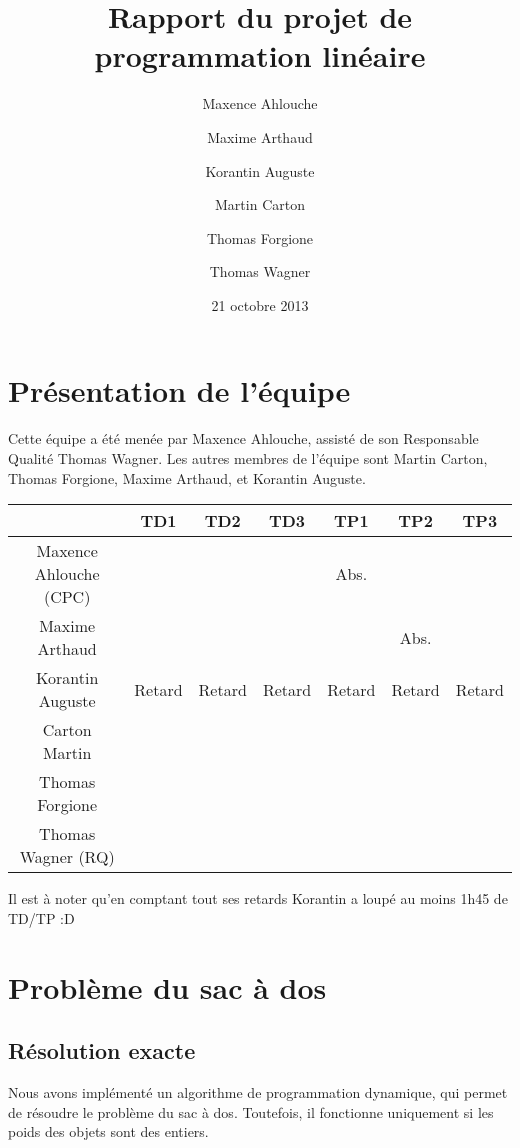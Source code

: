 \documentclass{scrartcl}
\begin{document}
\title{Rapport du projet de programmation linéaire}
\author{Maxence Ahlouche \and Maxime Arthaud \and Korantin Auguste
          \and Martin Carton \and Thomas Forgione \and Thomas Wagner}
\date{21 octobre 2013}
\maketitle
\tableofcontents
\newpage

\section{Présentation de l'équipe}
  Cette équipe a été menée par Maxence Ahlouche, assisté de son Responsable
  Qualité Thomas Wagner. Les autres membres de l'équipe sont Martin Carton,
  Thomas Forgione, Maxime Arthaud, et Korantin Auguste.

  \begin{table}[h]
    \centering
    \begin{tabular}{|c||c|c|c||c|c|c|}
      \hline
      & TD1 & TD2 & TD3 & TP1 & TP2 & TP3 \\
      \hline\hline
      Maxence Ahlouche (CPC) & & & & Abs. & & \\
      \hline
      Maxime Arthaud & & & & & Abs. & \\
      \hline
      Korantin Auguste & Retard & Retard & Retard & Retard & Retard & Retard \\
      \hline
      Carton Martin &&&&&&\\
      \hline
      Thomas Forgione &&&&&&\\
      \hline
      Thomas Wagner (RQ) &&&&&&\\
      \hline
    \end{tabular}
  \end{table}

  Il est à noter qu'en comptant tout ses retards Korantin a loupé au moins 1h45
  de TD/TP :D
  
\section{Problème du sac à dos}
  \subsection{Résolution exacte}
    Nous avons implémenté un algorithme de programmation dynamique, qui permet
    de résoudre le problème du sac à dos.  Toutefois, il fonctionne uniquement
    si les poids des objets sont des entiers.
\end{document}
